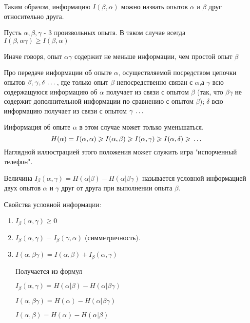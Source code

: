 \documentclass[a4paper,12pt]{report}
\begin{document}
	Таким образом, информацию $I(\beta,\alpha)$ можно назвать  опытов $\alpha$ и $\beta$ друг относительно друга.
	
	Пусть $\alpha, \beta, \gamma$ - 3 произвольных опыта. В таком случае всегда $I(\beta,\alpha\gamma) \ge I(\beta,\alpha)$
	
	Иначе говоря, опыт $\alpha\gamma$ содержит не меньше информации, чем простой опыт $\beta$
	 
	Про  передаче информации об опыте $\alpha$, осуществляемой посредством цепочки опытов $\beta, \gamma, \delta \,\ldots\,$, где только опыт $\beta$ непосредственно связан с $\alpha$,а $\gamma$ всю содержащуюся информацию об $\alpha$ получает из связи с опытом $\beta$ (так, что $\beta\gamma$ не содержит дополнительной информации по сравнению с опытом $\beta$); $\delta$ всю информацию получает из связи с опытом $\gamma \,\ldots\,$
	 
	Информация об опыте $\alpha$ в этом случае может только уменьшаться. 
	$$
	  H(\alpha) = I(\alpha,\alpha) 
	              \geqslant I(\alpha,\beta)
	              \geqslant I(\alpha,\gamma)
	              \geqslant I(\alpha,\delta)
	              \geqslant \,\ldots\,
	$$
	Наглядной иллюстрацией этого положения может служить игра "испорченный телефон".
	 	 
	Величина $I_\beta(\alpha,\gamma) = H(\alpha|\beta) - H(\alpha|\beta\gamma)$ называется условной информацией двух опытов $\alpha$ и $\gamma$ друг от друга при выполнении опыта $\beta$.
	
	Свойства условной информации:


	\begin{enumerate}
	
	\item	$I_\beta(\alpha,\gamma) \ge 0$
	
	\item	$I_\beta(\alpha,\gamma) = I_\beta(\gamma,\alpha)$ (симметричность).

	\item	$I(\alpha,\beta\gamma) = I(\alpha,\beta) + I_\beta(\alpha,\gamma)$
	
		Получается из формул 
		
		$I_\beta(\alpha,\gamma) =  H(\alpha|\beta) - H(\alpha|\beta\gamma)$
	
		$I(\alpha,\beta\gamma) = H(\alpha) - H(\alpha|\beta\gamma)$
		
		$I(\alpha,\beta) = H(\alpha) - H(\alpha|\beta)$
	
	\end{enumerate}	
\end{document}

